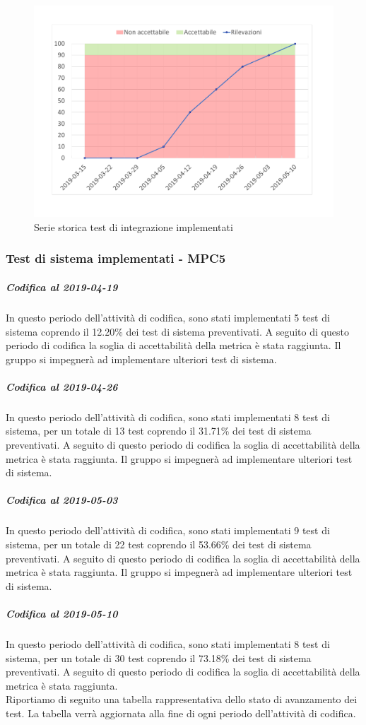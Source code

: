 \begin{figure}[H]
	\centering
	\includegraphics[scale=0.6]{images/resoconto/MPC4Chart.pdf}
	\caption{Serie storica test di integrazione implementati}	
\end{figure}

\subsubsection{Test di sistema implementati - MPC5}
\subparagraph{Codifica al 2019-04-19}
In questo periodo dell'attività di codifica, sono stati implementati 5 test di sistema coprendo il 12.20\% dei test di sistema preventivati.
A seguito di questo periodo di codifica la soglia di accettabilità della metrica è stata raggiunta.
Il gruppo si impegnerà ad implementare ulteriori test di sistema.


\subparagraph{Codifica al 2019-04-26}
In questo periodo dell'attività di codifica, sono stati implementati 8 test di sistema, per un totale di 13 test coprendo il 31.71\% dei test di sistema preventivati.
A seguito di questo periodo di codifica la soglia di accettabilità della metrica è stata raggiunta.
Il gruppo si impegnerà ad implementare ulteriori test di sistema.


\subparagraph{Codifica al 2019-05-03}
In questo periodo dell'attività di codifica, sono stati implementati 9 test di sistema, per un totale di 22 test coprendo il 53.66\% dei test di sistema preventivati.
A seguito di questo periodo di codifica la soglia di accettabilità della metrica è stata raggiunta.
Il gruppo si impegnerà ad implementare ulteriori test di sistema.

\subparagraph{Codifica al 2019-05-10}
In questo periodo dell'attività di codifica, sono stati implementati 8 test di sistema, per un totale di 30 test coprendo il 73.18\% dei test di sistema preventivati.
A seguito di questo periodo di codifica la soglia di accettabilità della metrica è stata raggiunta.
\\
Riportiamo di seguito una tabella rappresentativa dello stato di avanzamento dei test. La tabella verrà aggiornata alla fine di ogni periodo dell'attività di codifica.

